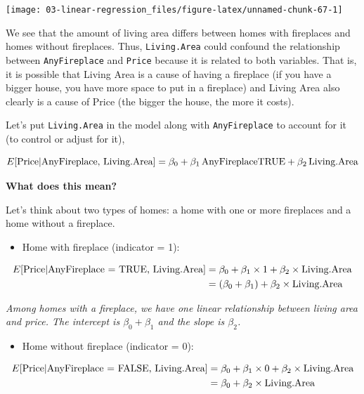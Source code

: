 \documentclass[
]{book}
\providecommand{\tightlist}{%
  \setlength{\itemsep}{0pt}\setlength{\parskip}{0pt}}
\begin{document}
\begin{center}\texttt{[image: 03-linear-regression\_files/figure-latex/unnamed-chunk-67-1]} \end{center}

We see that the amount of living area differs between homes with fireplaces and homes without fireplaces. Thus, \texttt{Living.Area} could confound the relationship between \texttt{AnyFireplace} and \texttt{Price} because it is related to both variables. That is, it is possible that Living Area is a cause of having a fireplace (if you have a bigger house, you have more space to put in a fireplace) and Living Area also clearly is a cause of Price (the bigger the house, the more it costs).

Let's put \texttt{Living.Area} in the model along with \texttt{AnyFireplace} to account for it (to control or adjust for it),

\[E[\hbox{Price} | \hbox{AnyFireplace, Living.Area}] = \beta_0 + \beta_1\,\hbox{AnyFireplaceTRUE} + \beta_2\,\hbox{Living.Area}\]

\textbf{What does this mean?}

Let's think about two types of homes: a home with one or more fireplaces and a home without a fireplace.

\begin{itemize}
\tightlist
\item
  Home with fireplace (indicator = 1):
\end{itemize}

\begin{align*}
E[\hbox{Price}| \hbox{AnyFireplace = TRUE, Living.Area}] &= \beta_0 + \beta_1 \times 1 + \beta_2 \times \hbox{Living.Area} \\
&= (\beta_0 + \beta_1 ) + \beta_2 \times \hbox{Living.Area}
\end{align*}

\emph{Among homes with a fireplace, we have one linear relationship between living area and price. The intercept is \(\beta_0+\beta_1\) and the slope is \(\beta_2\).}

\begin{itemize}
\tightlist
\item
  Home without fireplace (indicator = 0):
\end{itemize}

\begin{align*}
E[\hbox{Price}| \hbox{AnyFireplace = FALSE, Living.Area}] &= \beta_0 + \beta_1 \times 0 + \beta_2 \times \hbox{Living.Area} \\
&= \beta_0 + \beta_2 \times \hbox{Living.Area}
\end{align*}
\end{document}
